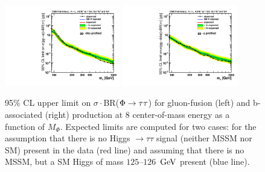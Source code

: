 \begin{figure}[!h]\begin{center}
\includegraphics[width=0.45\textwidth]{MSSM/PLOTS/cmb_ggH-limit.pdf}
\includegraphics[width=0.45\textwidth]{MSSM/PLOTS/cmb_bbH-limit.pdf}
\caption{
  95\% CL upper limit on $\sigma\cdot$BR($\Phi\to\mathrm{\tau}\mathrm{\tau}$) for gluon-fusion (left) and b-associated (right) production at 8 \TeV center-of-mass energy as a function of $M_{\Phi}$.
  Expected limits are computed for two cases:
  for the assumption that there is no Higgs $\to \tau\tau$ signal
  (neither MSSM nor SM) present in the data (red line)
  and assuming that there is no MSSM, but a SM Higgs of mass
  $125$--$126$~$\mathrm{GeV}$ present (blue line).
}
  \label{fig:ggH_bbH_limit}\end{center}\end{figure}

